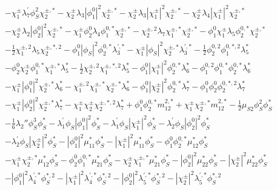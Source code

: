 \begin{align}
 &- \chi_1^\pm \lambda^{\prime}_7 \phi_{S}^{2} \chi_2^{\pm,*} - \chi_2^\pm \lambda_3 |\phi_1^0|^2 \chi_2^{\pm,*} - \chi_2^\pm \lambda_3 |\chi_1^\pm|^2 \chi_2^{\pm,*} - \chi_2^\pm \lambda_4 |\chi_1^\pm|^2 \chi_2^{\pm,*} \nonumber \\ 
 &- \chi_2^\pm \lambda_2 |\phi_2^0|^2 \chi_2^{\pm,*} - \chi_1^\pm \phi_2^0 \lambda_4 \phi_1^{0,*} \chi_2^{\pm,*} - \chi_{2}^{\pm,2} \lambda_7 \chi_1^{\pm,*} \chi_2^{\pm,*} - \phi_1^0 \chi_1^\pm \lambda_5 \phi_2^{0,*} \chi_2^{\pm,*} \nonumber \\ 
 &-\frac{1}{2} \chi_{1}^{\pm,2} \lambda_5 \chi_{2}^{\pm,*,2} - \phi_1^0 |\phi_S|^2 \phi_2^{0,*} \lambda^{{\prime},*}_3 - \chi_1^\pm |\phi_S|^2 \chi_2^{\pm,*} \lambda^{{\prime},*}_3 -\frac{1}{2} \phi_{2}^{0,2} \phi_{1}^{0,*,2} \lambda_5^* \nonumber \\ 
 &- \phi_2^0 \chi_2^\pm \phi_1^{0,*} \chi_1^{\pm,*} \lambda_5^* -\frac{1}{2} \chi_{2}^{\pm,2} \chi_{1}^{\pm,*,2} \lambda_5^* - \phi_1^0 |\chi_1^\pm|^2 \phi_2^{0,*} \lambda_6^* - \phi_{1}^{0,2} \phi_1^{0,*} \phi_2^{0,*} \lambda_6^* \nonumber \\ 
 &- \chi_1^\pm |\phi_1^0|^2 \chi_2^{\pm,*} \lambda_6^* - \chi_{1}^{\pm,2} \chi_1^{\pm,*} \chi_2^{\pm,*} \lambda_6^* - \phi_1^0 |\chi_2^\pm|^2 \phi_2^{0,*} \lambda_7^* - \phi_1^0 \phi_2^0 \phi_{2}^{0,*,2} \lambda_7^* \nonumber \\ 
 &- \chi_1^\pm |\phi_2^0|^2 \chi_2^{\pm,*} \lambda_7^* - \chi_1^\pm \chi_2^\pm \chi_{2}^{\pm,*,2} \lambda_7^* +\phi_1^0 \phi_2^{0,*} m^{2,*}_{12} +\chi_1^\pm \chi_2^{\pm,*} m^{2,*}_{12} -\frac{1}{2} \mu_{S2} \phi_{S}^{2} \phi_S^* \nonumber \\ 
 &-\frac{1}{6} \lambda_2'' \phi_{S}^{3} \phi_S^* - \lambda^{\prime}_1 \phi_S |\phi_1^0|^2 \phi_S^* - \lambda^{\prime}_1 \phi_S |\chi_1^\pm|^2 \phi_S^* - \lambda^{\prime}_2 \phi_S |\phi_2^0|^2 \phi_S^* \nonumber \\ 
 &- \lambda^{\prime}_2 \phi_S |\chi_2^\pm|^2 \phi_S^* - |\phi_1^0|^2 \mu_{11}^* \phi_S^* - |\chi_1^\pm|^2 \mu_{11}^* \phi_S^* - \phi_1^0 \phi_2^{0,*} \mu_{12}^* \phi_S^* \nonumber \\ 
 &- \chi_1^\pm \chi_2^{\pm,*} \mu_{12}^* \phi_S^* - \phi_2^0 \phi_1^{0,*} \mu_{21}^* \phi_S^* - \chi_2^\pm \chi_1^{\pm,*} \mu_{21}^* \phi_S^* - |\phi_2^0|^2 \mu_{22}^* \phi_S^* - |\chi_2^\pm|^2 \mu_{22}^* \phi_S^* \nonumber \\ 
 &- |\phi_1^0|^2 \lambda^{{\prime},*}_4 \phi_{S}^{*,2} - |\chi_1^\pm|^2 \lambda^{{\prime},*}_4 \phi_{S}^{*,2} - |\phi_2^0|^2 \lambda^{{\prime},*}_5 \phi_{S}^{*,2} - |\chi_2^\pm|^2 \lambda^{{\prime},*}_5 \phi_{S}^{*,2} \nonumber \\ 

\end{align}
